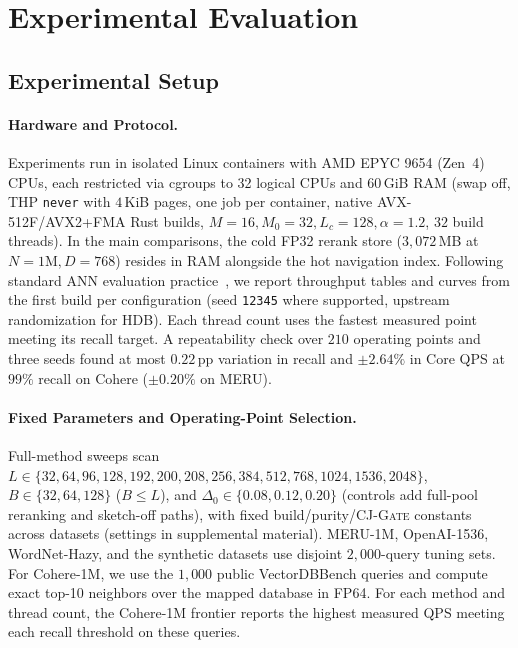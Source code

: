 \section{Experimental Evaluation}
\label{sec:eval}

\subsection{Experimental Setup}
\label{subsec:eval_setup}

\paragraph{Hardware and Protocol.}
Experiments run in isolated Linux containers with {AMD EPYC 9654} ({Zen~4}) CPUs, each restricted via cgroups to 32 logical CPUs and $60$\,GiB RAM (swap off, {THP} \texttt{never} with $4$\,KiB pages, one job per container, native {AVX-512F}/{AVX2+FMA} Rust builds, $M = 16, M_0 = 32, L_c = 128, \alpha = 1.2$, $32$ build threads). In the main comparisons, the cold FP32 rerank store ($3{,}072$\,MB at $N=1\text{M}, D=768$) resides in RAM alongside the hot navigation index.
Following standard ANN evaluation practice~\cite{aumuller2020annbenchmarks,simhadri2022results}, we report throughput tables and curves from the first build per configuration (seed \texttt{12345} where supported, upstream randomization for HDB). Each thread count uses the fastest measured point meeting its recall target. A repeatability check over $210$ operating points and three seeds found at most $0.22$\,pp variation in recall and $\pm2.64\%$ in Core QPS at $99\%$ recall on Cohere ($\pm0.20\%$ on MERU).

\paragraph{Fixed Parameters and Operating-Point Selection.}
Full-method sweeps scan $L\in\{32,\allowbreak64,\allowbreak96,\allowbreak128,\allowbreak192,\allowbreak200,\allowbreak208,\allowbreak256,\allowbreak384,\allowbreak512,\allowbreak768,\allowbreak1024,\allowbreak1536,\allowbreak2048\}$, $B \in \{32, 64, 128\}$ ($B \le L$), and $\Delta_0 \in \{0.08, 0.12, 0.20\}$ (controls add full-pool reranking and sketch-off paths), with fixed build/purity/\textsc{CJ-Gate} constants across datasets (settings in supplemental material).
{MERU-1M}, {OpenAI-1536}, {WordNet-Hazy}, and the synthetic datasets use disjoint $2{,}000$-query tuning sets. For {Cohere-1M}, we use the $1{,}000$ public {VectorDBBench} queries and compute exact top-10 neighbors over the mapped database in FP64. For each method and thread count, the {Cohere-1M} frontier reports the highest measured QPS meeting each recall threshold on these queries.

